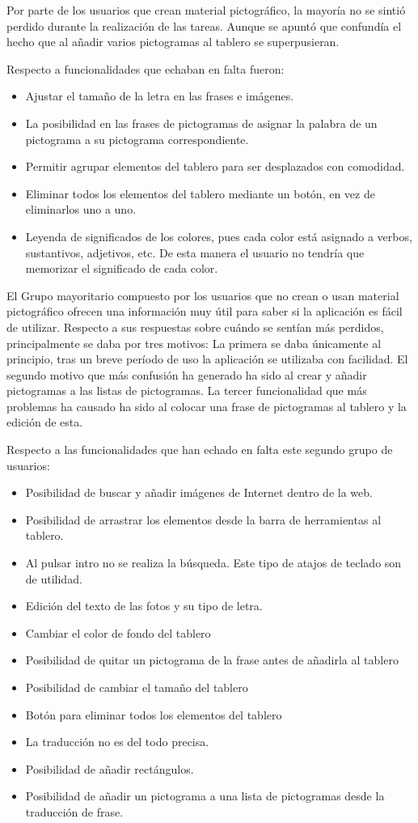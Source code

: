 Por parte de los usuarios que crean material pictográfico, la mayoría no se sintió perdido durante la realización de las tareas. Aunque se apuntó que confundía el hecho que al añadir varios pictogramas al tablero se superpusieran. 

Respecto a funcionalidades que echaban en falta fueron: 
\begin{itemize}
	\item Ajustar el tamaño de la letra en las frases e imágenes. 
	\item La posibilidad en las frases de pictogramas de asignar la palabra de un pictograma a su pictograma correspondiente. 
	\item Permitir agrupar elementos del tablero para ser desplazados con comodidad.
	\item Eliminar todos los elementos del tablero mediante un botón, en vez de eliminarlos uno a uno.
	\item Leyenda de significados de los colores, pues cada color está asignado a verbos, sustantivos, adjetivos, etc. De esta manera el usuario no tendría que memorizar el significado de cada color.
\end{itemize}


El Grupo mayoritario compuesto por los usuarios que no crean o usan material pictográfico ofrecen una información muy útil para saber si la aplicación es fácil de utilizar. Respecto a sus respuestas sobre cuándo se sentían más perdidos, principalmente se daba por tres motivos: La primera se daba únicamente al principio, tras un breve período de uso la aplicación se utilizaba con facilidad. El segundo motivo que más confusión ha generado ha sido al crear y añadir pictogramas a las listas de pictogramas. La tercer funcionalidad que más problemas ha causado ha sido al colocar una frase de pictogramas al tablero y la edición de esta. 

Respecto a las funcionalidades que han echado en falta este segundo grupo de usuarios:

\begin{itemize}
	\item Posibilidad de buscar y añadir imágenes de Internet dentro de la web.
	\item Posibilidad de arrastrar los elementos desde la barra de herramientas al tablero.
	\item Al pulsar intro no se realiza la búsqueda. Este tipo de atajos de teclado son de utilidad.
	\item Edición del texto de las fotos y su tipo de letra.
	\item Cambiar el color de fondo del tablero
	\item Posibilidad de quitar un pictograma de la frase antes de añadirla al tablero
	\item Posibilidad de cambiar el tamaño del tablero
	\item Botón para eliminar todos los elementos del tablero
	\item La traducción no es del todo precisa.
	\item Posibilidad de añadir rectángulos.
	\item Posibilidad de añadir un pictograma a una lista de pictogramas desde la traducción de frase. 
\end{itemize}


